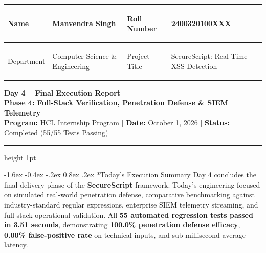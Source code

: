 \documentclass[11pt,a4paper]{article}
\makeatletter
\renewcommand{\section}{\@startsection{section}{1}{\z@}%
  {-1.6ex \@plus -0.4ex \@minus -.2ex}%
  {0.8ex \@plus .2ex}%
  {\normalfont\large\bfseries\color{primaryblue}}}
\makeatother
\begin{document}

\noindent
\begin{tabularx}{\textwidth}{|>{\bfseries\raggedright\arraybackslash}p{2.2cm}|>{\raggedright\arraybackslash}X|>{\bfseries\raggedright\arraybackslash}p{2.3cm}|>{\raggedright\arraybackslash}X|}
\hline
\rowcolor{primaryblue!10}
Name & Manvendra Singh & Roll Number & 2400320100XXX \\
\hline
\rowcolor{primaryblue!5}
Department & Computer Science \& Engineering & Project Title & SecureScript: Real-Time XSS Detection \\
\hline
\end{tabularx}

\vspace{0.8em}

\begin{center}
    {\LARGE \textbf{\color{primaryblue} Day 4 -- Final Execution Report}} \\[0.25em]
    {\large \textbf{Phase 4: Full-Stack Verification, Penetration Defense \& SIEM Telemetry}} \\[0.2em]
    {\footnotesize \textbf{Program:} HCL Internship Program \quad $\vert$ \quad \textbf{Date:} October 1, 2026 \quad $\vert$ \quad \textbf{Status:} Completed (55/55 Tests Passing)}
\end{center}

\vspace{0.3em}
\hrule height 1pt
\vspace{0.8em}

\section*{Today's Execution Summary}
Day 4 concludes the final delivery phase of the \textbf{SecureScript} framework. Today's engineering focused on simulated real-world penetration defense, comparative benchmarking against industry-standard regular expressions, enterprise SIEM telemetry streaming, and full-stack operational validation. All \textbf{55 automated regression tests passed in 3.51 seconds}, demonstrating \textbf{100.0\% penetration defense efficacy}, \textbf{0.00\% false-positive rate} on technical inputs, and sub-millisecond average latency.
\end{document}

